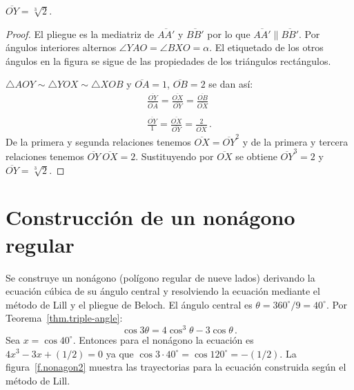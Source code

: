 \begin{theorem}
$\overline{OY}=\sqrt[3]{2}$.
\end{theorem}
\begin{proof}
El pliegue es la mediatriz de $\overline{AA'}$ y $\overline{BB'}$ por lo que $\overline{AA'}\parallel\overline{BB'}$. Por ángulos interiores alternos $\angle YAO =\angle BXO=\alpha$. El etiquetado de los otros ángulos en la figura se sigue de las propiedades de los triángulos rectángulos.

$\triangle AOY\sim \triangle YOX \sim \triangle XOB$ y $\overline{OA}=1$, $\overline{OB}=2$ se dan así:
\[
\begin{array}{l}
\displaystyle\frac{\overline{OY}}{\overline{OA}}=\displaystyle\frac{\overline{OX}}{\overline{OY}}=\displaystyle\frac{\overline{OB}}{\overline{OX}}\\
\\
\displaystyle\frac{\overline{OY}}{1}=\displaystyle\frac{\overline{OX}}{\overline{OY}}=\displaystyle\frac{2}{\overline{OX}}\,.
\end{array}
\]
De la primera y segunda relaciones tenemos $\overline{OX}=\overline{OY}^2$ y de la primera y tercera relaciones tenemos $\overline{OY}\:\overline{OX}=2$.
Sustituyendo por $\overline{OX}$ se obtiene $\overline{OY}^3=2$ y
$\overline{OY}=\sqrt[3]{2}$.
\end{proof}

\section{Construcción de un nonágono regular}\label{s.nonagon}

Se construye un nonágono (polígono regular de nueve lados) derivando la ecuación cúbica de su ángulo central y resolviendo la ecuación mediante el método de Lill y el pliegue de Beloch. El ángulo central es $\theta=360^\circ/9=40^\circ$. Por Teorema~\ref{thm.triple-angle}:
\[
\cos 3\theta=4\cos^3 \theta -3\cos\theta\,.
\]
Sea $x=\cos 40^{\circ}$. Entonces para el nonágono la ecuación es $4x^3-3x+(1/2)=0$ ya que $\cos 3\cdot 40^\circ=\cos 120^\circ=-(1/2)$. La figura~\ref{f.nonagon2} muestra las trayectorias para la ecuación construida según el método de Lill.

